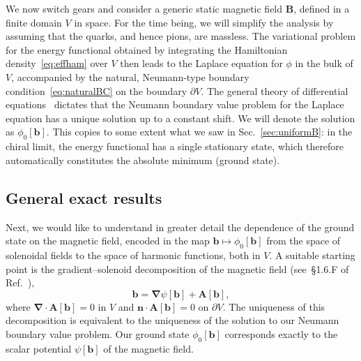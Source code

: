 \documentclass[pdflatex,iicol,sn-mathphys-num]{sn-jnl}
\let\p=\phi
\let\de=\partial
\newcommand{\vek}[1]{\bm{#1}}%
\newcommand{\grad}{\vek\nabla}%
\newcommand{\divg}{\grad\cdot}%
\newcommand{\bmag}{b}%
\begin{document}
We now switch gears and consider a generic static magnetic field $\vek B$, defined in a finite domain $V$ in space. For the time being, we will simplify the analysis by assuming that the quarks, and hence pions, are massless. The variational problem for the energy functional obtained by integrating the Hamiltonian density~\eqref{eq:effham} over $V$ then leads to the Laplace equation for $\p$ in the bulk of $V$, accompanied by the natural, Neumann-type boundary condition~\eqref{eq:naturalBC} on the boundary $\de V$. The general theory of differential equations~\cite{Arnold2004} dictates that the Neumann boundary value problem for the Laplace equation has a unique solution up to a constant shift. We will denote the solution as $\p_0[\vek\bmag]$. This copies to some extent what we saw in Sec.~\ref{sec:uniformB}: in the chiral limit, the energy functional has a single stationary state, which therefore automatically constitutes the absolute minimum (ground state).


\subsection{General exact results}
\label{subsec:nonuniformBzeroMgeneral}

Next, we would like to understand in greater detail the dependence of the ground state on the magnetic field, encoded in the map $\vek\bmag\mapsto\p_0[\vek\bmag]$ from the space of solenoidal fields to the space of harmonic functions, both in $V$. A suitable starting point is the gradient--solenoid decomposition of the magnetic field (see~\S 1.6.F of Ref.~\cite{Gallavotti2002}),
\begin{equation}
\vek\bmag=\grad\psi[\vek\bmag]+\vek A[\vek\bmag],
\label{eq:helmholtz}
\end{equation}
where $\divg\vek A[\vek\bmag]=0$ in $V$ and $\vek n\cdot\vek A[\vek\bmag]=0$ on $\de V$. The uniqueness of this decomposition is equivalent to the uniqueness of the solution to our Neumann boundary value problem. Our ground state $\p_0[\vek\bmag]$ corresponds exactly to the scalar potential $\psi[\vek\bmag]$ of the magnetic field.
\end{document}
